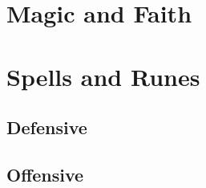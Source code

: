 
\section{Magic and Faith}
\section{Spells and Runes}
\subsection{Defensive}

\subsection{Offensive}


